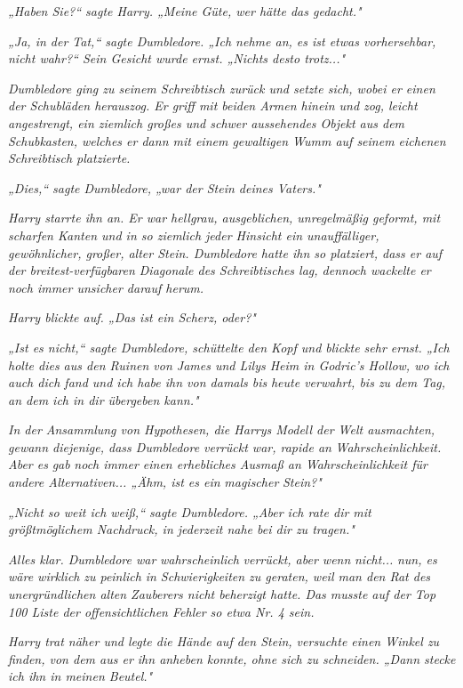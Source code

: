 {\emph{„Haben Sie?“ sagte Harry. „Meine Güte, wer hätte das gedacht."}

\emph{„Ja, in der Tat,“ sagte Dumbledore. „Ich nehme an, es ist etwas vorhersehbar, nicht wahr?“ Sein Gesicht wurde ernst. „Nichts desto trotz..."}

\emph{Dumbledore ging zu seinem Schreibtisch zurück und setzte sich, wobei er einen der Schubläden herauszog. Er griff mit beiden Armen hinein und zog, leicht angestrengt, ein ziemlich großes und schwer aussehendes Objekt aus dem Schubkasten, welches er dann mit einem gewaltigen Wumm auf seinem eichenen Schreibtisch platzierte.}

\emph{„Dies,“ sagte Dumbledore, „war der Stein deines Vaters."}

\emph{Harry starrte ihn an. Er war hellgrau, ausgeblichen, unregelmäßig geformt, mit scharfen Kanten und in so ziemlich jeder Hinsicht ein unauffälliger, gewöhnlicher, großer, alter Stein. Dumbledore hatte ihn so platziert, dass er auf der breitest-verfügbaren Diagonale des Schreibtisches lag, dennoch wackelte er noch immer unsicher darauf herum.}

\emph{Harry blickte auf. „Das ist ein Scherz, oder?"}

\emph{„Ist es nicht,“ sagte Dumbledore, schüttelte den Kopf und blickte sehr ernst. „Ich holte dies aus den Ruinen von James und Lilys Heim in Godric's Hollow, wo ich auch dich fand und ich habe ihn von damals bis} \emph{heute verwahrt, bis zu dem Tag, an dem ich in dir übergeben kann."}

\emph{In der Ansammlung von Hypothesen, die Harrys Modell der Welt ausmachten, gewann diejenige, dass Dumbledore verrückt war, rapide an} \emph{Wahrscheinlichkeit. Aber es} \emph{\emph{gab}} \emph{noch immer einen erhebliches Ausmaß an Wahrscheinlichkeit für andere Alternativen... „Ähm, ist es ein} \emph{\emph{magischer}} \emph{Stein?"}

\emph{„Nicht so weit ich weiß,“ sagte Dumbledore. „Aber ich rate dir mit größtmöglichem Nachdruck, in jederzeit nahe bei dir zu tragen."}

\emph{Alles klar. Dumbledore war} \emph{\emph{wahrscheinlich}} \emph{verrückt, aber wenn} \emph{\emph{nicht...}} \emph{nun, es wäre wirklich} \emph{\emph{zu peinlich}} \emph{in Schwierigkeiten zu geraten, weil man den Rat des unergründlichen alten Zauberers nicht beherzigt hatte. Das musste auf der Top 100 Liste der offensichtlichen Fehler so etwa Nr. 4 sein.}

\emph{Harry trat näher und legte die Hände auf den Stein, versuchte einen Winkel zu finden, von dem aus er ihn anheben konnte, ohne sich zu schneiden. „Dann stecke ich ihn in meinen Beutel."}

}
